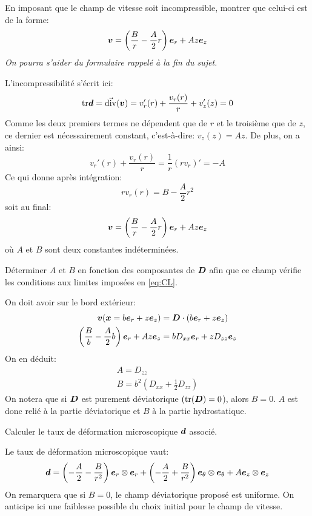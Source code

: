 \documentclass[french,12pt]{exam}
\begin{document}
\begin{questions}
\question En imposant que le champ de vitesse soit incompressible, montrer que celui-ci est de la forme:\\
\begin{equation}
  \boldsymbol{v} = \left( \frac{B}{r} -  \frac{A}{2}r \right)  \boldsymbol{e}_r +  A z \boldsymbol{e}_z 
\end{equation}
\textit{On pourra s'aider du formulaire rappelé à la fin du sujet.}

\begin{solution}
L'incompressibilité s'écrit ici:
$$\mathrm{tr}\boldsymbol{d} = \vec{\mathrm{div}}{\left(\boldsymbol{v}\right)} = v_r'(r)+\dfrac{v_r(r)}{r}+v_z'(z)=0$$
Comme les deux premiers termes ne dépendent que de $r$ et le troisième que de $z$, ce dernier est nécessairement constant, c'est-à-dire: $v_z(z) = Az$. De plus, on a ainsi:
$$v_r'(r)+\dfrac{v_r(r)}{r}= \dfrac{1}{r}(rv_r)'=-A$$
Ce qui donne après intégration:
$$rv_r(r) = B -  \frac{A}{2}r^2$$
soit au final:
\begin{equation}
  \boldsymbol{v} = \left( \frac{B}{r} -  \frac{A}{2}r \right)  \boldsymbol{e}_r +  A z \boldsymbol{e}_z 
\end{equation}
où $A$ et $B$ sont deux constantes indéterminées.
\end{solution}

\question Déterminer $A$ et $B$ en fonction des composantes de $\boldsymbol{D}$ afin que ce champ vérifie les conditions aux limites imposées en \eqref{eq:CL}.
\begin{solution}
On doit avoir sur le bord extérieur:
\begin{align*}
\boldsymbol{v}(\boldsymbol{x}=b\boldsymbol{e}_r+z\boldsymbol{e}_z) &= \boldsymbol{D}\cdot(b\boldsymbol{e}_r+z\boldsymbol{e}_z)\\
\left(\frac{B}{b}-\frac{A}{2}b\right)\boldsymbol{e}_r + Az\boldsymbol{e}_z &= b D_{xx}\boldsymbol{e}_r + zD_{zz}\boldsymbol{e}_z
\end{align*}
On en déduit:
$$
\boxed{
\begin{array}{l}
A = D_{zz}\\
B = b^2\left(D_{xx}+\frac{1}{2}D_{zz}\right)
\end{array}}
$$
On notera que si $\boldsymbol{D}$ est purement déviatorique $(\mathrm{tr}(\boldsymbol{D})=0$), alors $B=0$. $A$ est donc relié à la partie déviatorique et $B$ à la partie hydrostatique.
\end{solution}

\question Calculer le taux de déformation microscopique $\boldsymbol{d}$ associé.
\begin{solution}
Le taux de déformation microscopique vaut:
$$\boldsymbol{d} = \left(-\frac{A}{2}-\frac{B}{r^2}\right)\boldsymbol{e}_r\otimes\boldsymbol{e}_r + \left(-\frac{A}{2}+\frac{B}{r^2}\right)\boldsymbol{e}_\theta\otimes\boldsymbol{e}_\theta + A\boldsymbol{e}_z\otimes\boldsymbol{e}_z$$
On remarquera que si $B=0$, le champ déviatorique proposé est uniforme. On anticipe ici une faiblesse possible du choix initial pour le champ de vitesse.
\end{solution}


\end{questions}
\end{document}
